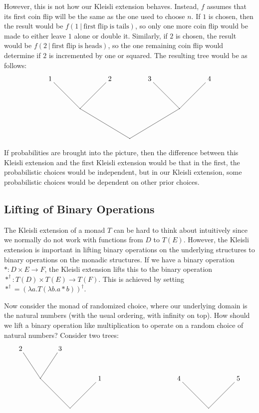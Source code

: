 However, this is not how our Kleisli extension behaves.  Instead, $f$ assumes that its first coin flip will be the same as the one used to choose $n$.  If $1$ is chosen, then the result would be $f(1\ |\  \mathrm{first\;flip\;is\;tails})$, so only one more coin flip would be made to either leave $1$ alone or double it.  Similarly, if $2$ is chosen, the result would be $f(2\ |\ \mathrm{first\;flip\;is\;heads})$, so the one remaining coin flip would determine if $2$ is incremented by one or squared.  The resulting tree would be as follows:
\[
\begin{xy}
(0,30)*+{1} = "v4";%
(30,30)*+{2} = "v5";%
(50,30)*+{3} = "v6";%
(80,30)*+{4} = "v7";%
(15,15)*{} = "v8";%
(65,15)*{} = "v9";%
(40,0)*{} = "v10";%
{\ar@{-} "v9"; "v6"};%
{\ar@{-} "v9"; "v7"};%
{\ar@{-} "v8"; "v5"};%
{\ar@{-} "v8"; "v4"};%
{\ar@{-} "v10"; "v8"};%
{\ar@{-} "v10"; "v9"};
\end{xy}
\]

If probabilities are brought into the picture, then the difference between this Kleisli extension and the first Kleisli extension would be that in the first, the probabilistic choices would be independent, but in our Kleisli extension, some probabilistic choices would be dependent on other prior choices.

\subsection{Lifting of Binary Operations}\label{kleislilift}

The Kleisli extension of a monad $T$ can be hard to think about intuitively since we normally do not work with functions from $D$ to $T(E)$.  However, the Kleisli extension is important in lifting binary operations on the underlying structures to binary operations on the monadic structures.  If we have a binary operation $*: D \times E \to F$, the Kleisli extension lifts this to the binary operation $*^\dagger : T(D) \times T(E) \to T(F)$.  This is achieved by setting 
$*^\dagger = (\lambda a. T(\lambda b. a * b))^\dagger$.

Now consider the monad of randomized choice, where our underlying domain is the natural numbers (with the usual ordering, with infinity on top).  How should we lift a binary operation like multiplication to operate on a random choice of natural numbers?  Consider two trees:
\[
\begin{xy}
(0,30)*+{2} = "v4";%
(20,30)*+{3} = "v5";%
(10,15)*{} = "v8";%
(40,15)*+{1} = "v9";%
(25,0)*{} = "v10";%
(95,0)*{} = "v11";%
(80,15)*+{4} = "v12";%
(110,15)*+{5} = "v13";%
{\ar@{-} "v8"; "v5"};%
{\ar@{-} "v8"; "v4"};%
{\ar@{-} "v10"; "v8"};%
{\ar@{-} "v10"; "v9"};%
{\ar@{-} "v11"; "v12"};%
{\ar@{-} "v11"; "v13"};%
\end{xy}
\]

